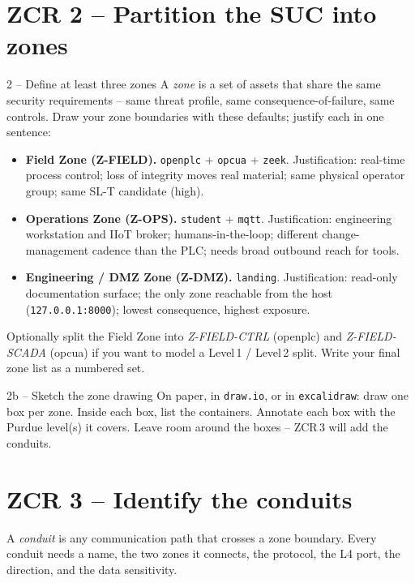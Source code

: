 \documentclass[11pt,a4paper]{article}
\begin{document}
\section*{ZCR 2 -- Partition the SUC into zones}

\begin{stepbox}{2 -- Define at least three zones}
A \emph{zone} is a set of assets that share the same security requirements -- same threat profile, same consequence-of-failure, same controls. Draw your zone boundaries with these defaults; justify each in one sentence:
\begin{itemize}\setlength{\itemsep}{1pt}
  \item \textbf{Field Zone (Z-FIELD).} \texttt{openplc} + \texttt{opcua} + \texttt{zeek}. Justification: real-time process control; loss of integrity moves real material; same physical operator group; same SL-T candidate (high).
  \item \textbf{Operations Zone (Z-OPS).} \texttt{student} + \texttt{mqtt}. Justification: engineering workstation and IIoT broker; humans-in-the-loop; different change-management cadence than the PLC; needs broad outbound reach for tools.
  \item \textbf{Engineering / DMZ Zone (Z-DMZ).} \texttt{landing}. Justification: read-only documentation surface; the only zone reachable from the host (\texttt{127.0.0.1:8000}); lowest consequence, highest exposure.
\end{itemize}
Optionally split the Field Zone into \emph{Z-FIELD-CTRL} (openplc) and \emph{Z-FIELD-SCADA} (opcua) if you want to model a Level\,1 / Level\,2 split. Write your final zone list as a numbered set.
\end{stepbox}

\begin{stepbox}{2b -- Sketch the zone drawing}
On paper, in \texttt{draw.io}, or in \texttt{excalidraw}: draw one box per zone. Inside each box, list the containers. Annotate each box with the Purdue level(s) it covers. Leave room around the boxes -- ZCR\,3 will add the conduits.
\end{stepbox}

\section*{ZCR 3 -- Identify the conduits}

A \emph{conduit} is any communication path that crosses a zone boundary. Every conduit needs a name, the two zones it connects, the protocol, the L4 port, the direction, and the data sensitivity.
\end{document}
